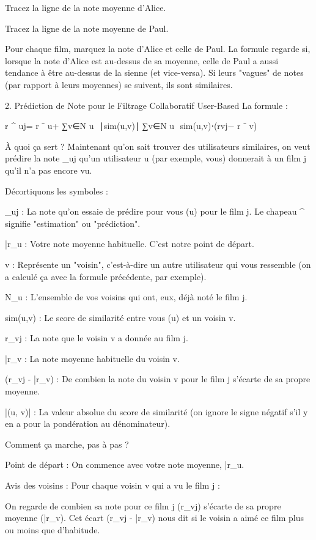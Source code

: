 Tracez la ligne de la note moyenne d'Alice.

Tracez la ligne de la note moyenne de Paul.

Pour chaque film, marquez la note d'Alice et celle de Paul.
La formule regarde si, lorsque la note d'Alice est au-dessus de sa moyenne, celle de Paul a aussi tendance à être au-dessus de la sienne (et vice-versa). Si leurs "vagues" de notes (par rapport à leurs moyennes) se suivent, ils sont similaires.

2. Prédiction de Note pour le Filtrage Collaboratif User-Based
La formule :


r
^
 uj= 
r
ˉ
 u+ 
∑v∈N 
u
​
 ∣sim(u,v)∣
∑v∈N 
u
​
 sim(u,v)⋅(rvj− 
r
ˉ
 v)
​
 
À quoi ça sert ?
Maintenant qu'on sait trouver des utilisateurs similaires, on veut prédire la note _{uj} qu'un utilisateur u (par exemple, vous) donnerait à un film j qu'il n'a pas encore vu.

Décortiquons les symboles :

_{uj} : La note qu'on essaie de prédire pour vous (u) pour le film j. Le chapeau ^ signifie "estimation" ou "prédiction".

\bar{r}_u : Votre note moyenne habituelle. C'est notre point de départ.

v : Représente un "voisin", c'est-à-dire un autre utilisateur qui vous ressemble (on a calculé ça avec la formule précédente, par exemple).

N_u : L'ensemble de vos voisins qui ont, eux, déjà noté le film j.

sim(u,v) : Le score de similarité entre vous (u) et un voisin v.

r_{vj} : La note que le voisin v a donnée au film j.

\bar{r}_v : La note moyenne habituelle du voisin v.

(r_{vj} - \bar{r}_v) : De combien la note du voisin v pour le film j s'écarte de sa propre moyenne.

|(u, v)| : La valeur absolue du score de similarité (on ignore le signe négatif s'il y en a pour la pondération au dénominateur).

Comment ça marche, pas à pas ?

Point de départ : On commence avec votre note moyenne, \bar{r}_u.

Avis des voisins : Pour chaque voisin v qui a vu le film j :

On regarde de combien sa note pour ce film j (r_{vj}) s'écarte de sa propre moyenne (\bar{r}_v). Cet écart (r_{vj} - \bar{r}_v) nous dit si le voisin a aimé ce film plus ou moins que d'habitude.


